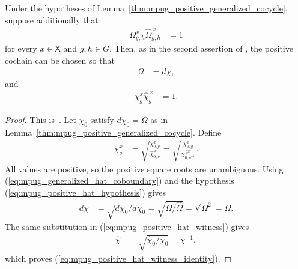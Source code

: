 \begin{lemma}
    \label{thm:mpug_positive_generalized_cocycle_hat}
    \leanok
    Under the hypotheses of
    Lemma~\ref{thm:mpug_positive_generalized_cocycle}, suppose additionally
    that
    \begin{align}
        \Omega^x_{g,h}\widehat\Omega^{\,x}_{g,h}
         & =1
        \label{eq:mpug_positive_hat_hypothesis}
    \end{align}
    for every $x\in\mathsf X$ and $g,h\in G$. Then, as in the second assertion
    of \cite[Corollary at lines~5950--5960]{FrancoRubio2025MPUGauging}, the
    positive cochain can be chosen so that
    \begin{align}
        \Omega & =d\chi,
        \label{eq:mpug_positive_hat_coboundary}
    \end{align}
    and
    \begin{align}
        \chi^x_g\widehat\chi^{\,x}_g
         & =1.
        \label{eq:mpug_positive_hat_witness_identity}
    \end{align}
\end{lemma}

\begin{proof}\leanok
    This is~\cite[``Hat-compatible positive primitive'']{QICLean2026Blueprint}.
    Let $\chi_0$ satisfy $d\chi_0=\Omega$ as in
    Lemma~\ref{thm:mpug_positive_generalized_cocycle}. Define
    \begin{align}
        \chi^x_g
         & =\sqrt{\frac{\chi^x_{0,g}}
            {\widehat\chi^{\,x}_{0,g}}}
        =\sqrt{\frac{\chi^x_{0,g}}
            {\chi^{\,g x}_{0,g^{-1}}}}.
        \label{eq:mpug_positive_hat_witness}
    \end{align}
    All values are positive, so the positive square roots are unambiguous.
    Using (\ref{eq:mpug_generalized_hat_coboundary}) and the hypothesis
    (\ref{eq:mpug_positive_hat_hypothesis}) gives
    \begin{align}
        d\chi
         & =\sqrt{d\chi_0/d\widehat\chi_0}
        =\sqrt{\Omega/\widehat\Omega}
        =\sqrt{\Omega^2}
        =\Omega.
    \end{align}
    The same substitution in
    (\ref{eq:mpug_positive_hat_witness}) gives
    \begin{align}
        \widehat\chi
         & =\sqrt{\widehat\chi_0/\chi_0}
        =\chi^{-1},
    \end{align}
    which proves
    (\ref{eq:mpug_positive_hat_witness_identity}).
\end{proof}

